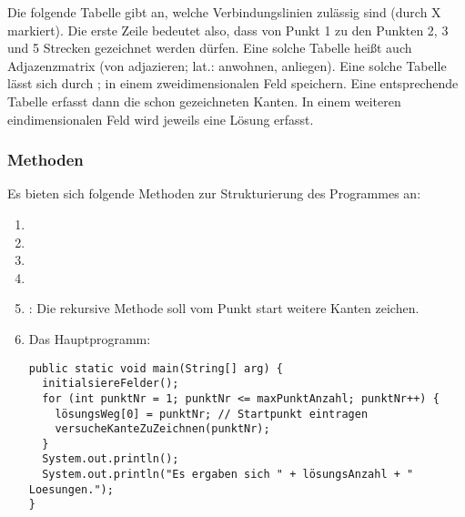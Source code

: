 \documentclass{bschlangaul-aufgabe}
\begin{document}
Die folgende Tabelle gibt an, welche Verbindungslinien zulässig sind
(durch X markiert). Die erste Zeile bedeutet also, dass von Punkt 1 zu
den Punkten 2, 3 und 5 Strecken gezeichnet werden dürfen. Eine solche
Tabelle heißt auch Adjazenzmatrix (von adjazieren; lat.: anwohnen,
anliegen). Eine solche Tabelle lässt sich durch ; in einem zweidimensionalen Feld speichern. Eine
entsprechende Tabelle  erfasst dann die
schon gezeichneten Kanten. In einem weiteren eindimensionalen Feld
wird jeweils eine Lösung erfasst.

\subsubsection{Methoden}

Es bieten sich folgende Methoden zur Strukturierung des Programmes an:

\begin{enumerate}
\item {}
\item {}
\item {}
\item {}
\item {}: Die rekursive
Methode soll vom Punkt start weitere Kanten zeichen.

\item Das Hauptprogramm:

\begin{verbatim}
public static void main(String[] arg) {
  initialsiereFelder();
  for (int punktNr = 1; punktNr <= maxPunktAnzahl; punktNr++) {
    lösungsWeg[0] = punktNr; // Startpunkt eintragen
    versucheKanteZuZeichnen(punktNr);
  }
  System.out.println();
  System.out.println("Es ergaben sich " + lösungsAnzahl + " Loesungen.");
}
\end{verbatim}

\end{enumerate}

\end{document}
